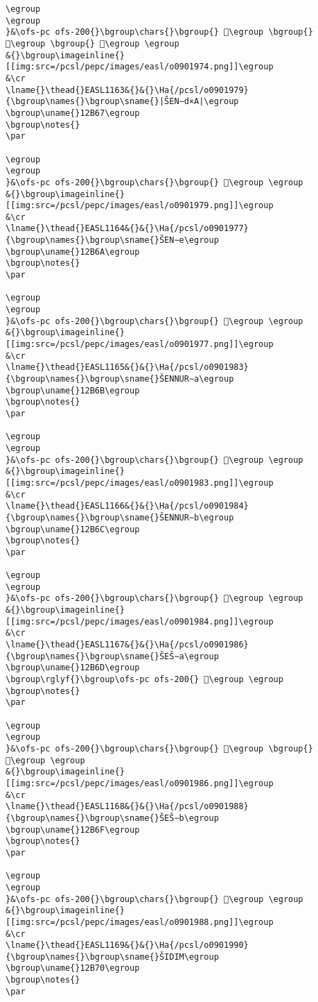 \begin{verbatim}
\egroup
\egroup
}&\ofs-pc ofs-200{}\bgroup\chars{}\bgroup{} 𒭦\egroup \bgroup{} 𒭨\egroup \bgroup{} 𒭩\egroup \egroup
&{}\bgroup\imageinline{}[[img:src=/pcsl/pepc/images/easl/o0901974.png]]\egroup
&\cr
\lname{}\thead{}EASL1163&{}&{}\Ha{/pcsl/o0901979}{\bgroup\names{}\bgroup\sname{}|ŠEN∼d×A|\egroup
\bgroup\uname{}12B67\egroup
\bgroup\notes{}
\par 

\egroup
\egroup
}&\ofs-pc ofs-200{}\bgroup\chars{}\bgroup{} 𒭧\egroup \egroup
&{}\bgroup\imageinline{}[[img:src=/pcsl/pepc/images/easl/o0901979.png]]\egroup
&\cr
\lname{}\thead{}EASL1164&{}&{}\Ha{/pcsl/o0901977}{\bgroup\names{}\bgroup\sname{}ŠEN∼e\egroup
\bgroup\uname{}12B6A\egroup
\bgroup\notes{}
\par 

\egroup
\egroup
}&\ofs-pc ofs-200{}\bgroup\chars{}\bgroup{} 𒭪\egroup \egroup
&{}\bgroup\imageinline{}[[img:src=/pcsl/pepc/images/easl/o0901977.png]]\egroup
&\cr
\lname{}\thead{}EASL1165&{}&{}\Ha{/pcsl/o0901983}{\bgroup\names{}\bgroup\sname{}ŠENNUR∼a\egroup
\bgroup\uname{}12B6B\egroup
\bgroup\notes{}
\par 

\egroup
\egroup
}&\ofs-pc ofs-200{}\bgroup\chars{}\bgroup{} 𒭫\egroup \egroup
&{}\bgroup\imageinline{}[[img:src=/pcsl/pepc/images/easl/o0901983.png]]\egroup
&\cr
\lname{}\thead{}EASL1166&{}&{}\Ha{/pcsl/o0901984}{\bgroup\names{}\bgroup\sname{}ŠENNUR∼b\egroup
\bgroup\uname{}12B6C\egroup
\bgroup\notes{}
\par 

\egroup
\egroup
}&\ofs-pc ofs-200{}\bgroup\chars{}\bgroup{} 𒭬\egroup \egroup
&{}\bgroup\imageinline{}[[img:src=/pcsl/pepc/images/easl/o0901984.png]]\egroup
&\cr
\lname{}\thead{}EASL1167&{}&{}\Ha{/pcsl/o0901986}{\bgroup\names{}\bgroup\sname{}ŠEŠ∼a\egroup
\bgroup\uname{}12B6D\egroup
\bgroup\rglyf{}\bgroup\ofs-pc ofs-200{} 𒭭\egroup \egroup
\bgroup\notes{}
\par 

\egroup
\egroup
}&\ofs-pc ofs-200{}\bgroup\chars{}\bgroup{} 𒭭\egroup \bgroup{} 𒭮\egroup \egroup
&{}\bgroup\imageinline{}[[img:src=/pcsl/pepc/images/easl/o0901986.png]]\egroup
&\cr
\lname{}\thead{}EASL1168&{}&{}\Ha{/pcsl/o0901988}{\bgroup\names{}\bgroup\sname{}ŠEŠ∼b\egroup
\bgroup\uname{}12B6F\egroup
\bgroup\notes{}
\par 

\egroup
\egroup
}&\ofs-pc ofs-200{}\bgroup\chars{}\bgroup{} 𒭯\egroup \egroup
&{}\bgroup\imageinline{}[[img:src=/pcsl/pepc/images/easl/o0901988.png]]\egroup
&\cr
\lname{}\thead{}EASL1169&{}&{}\Ha{/pcsl/o0901990}{\bgroup\names{}\bgroup\sname{}ŠIDIM\egroup
\bgroup\uname{}12B70\egroup
\bgroup\notes{}
\par 


\end{verbatim}
